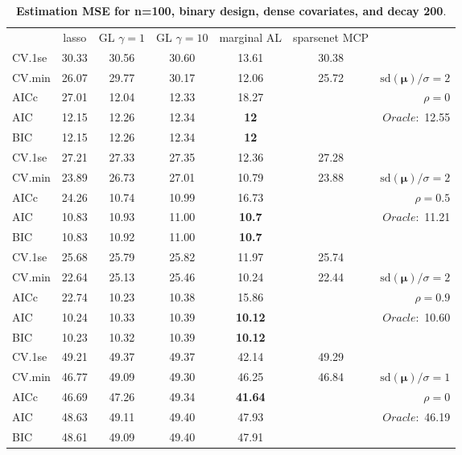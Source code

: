 \begin{table}\vspace{-.5cm}
\caption[l]{ { \bf Estimation MSE for n=100, binary design, 
dense covariates, and  decay  200}.}
\vspace{-.5cm}
\footnotesize{}
\begin{center}
\begin{tabular}{l*{5}{c}|r}
& lasso & GL $\gamma=1$ & GL $\gamma=10$ & marginal AL & sparsenet MCP  & \\
 \cline{1-7}
CV.1se & 30.33 & 30.56 & 30.60 & 13.61 & 30.38 & \\
CV.min & 26.07 & 29.77 & 30.17 & 12.06 & 25.72 &  $\mathrm{sd}(\mathbf{\mu})/\sigma=2$ \\
AICc & 27.01 & 12.04 & 12.33 & 18.27 & & $\rho=0$ \\
AIC & 12.15 & 12.26 & 12.34 & {\bf 12} & &  \multirow{2}{*}{$Oracle: $ 12.55} \\
BIC & 12.15 & 12.26 & 12.34 & {\bf 12} & &  \\
 \hline 
CV.1se & 27.21 & 27.33 & 27.35 & 12.36 & 27.28 & \\
CV.min & 23.89 & 26.73 & 27.01 & 10.79 & 23.88 &  $\mathrm{sd}(\mathbf{\mu})/\sigma=2$ \\
AICc & 24.26 & 10.74 & 10.99 & 16.73 & & $\rho=0.5$ \\
AIC & 10.83 & 10.93 & 11.00 & {\bf 10.7} & &  \multirow{2}{*}{$Oracle: $ 11.21} \\
BIC & 10.83 & 10.92 & 11.00 & {\bf 10.7} & &  \\
 \hline 
CV.1se & 25.68 & 25.79 & 25.82 & 11.97 & 25.74 & \\
CV.min & 22.64 & 25.13 & 25.46 & 10.24 & 22.44 &  $\mathrm{sd}(\mathbf{\mu})/\sigma=2$ \\
AICc & 22.74 & 10.23 & 10.38 & 15.86 & & $\rho=0.9$ \\
AIC & 10.24 & 10.33 & 10.39 & {\bf 10.12} & &  \multirow{2}{*}{$Oracle: $ 10.60} \\
BIC & 10.23 & 10.32 & 10.39 & {\bf 10.12} & &  \\
 \hline 
CV.1se & 49.21 & 49.37 & 49.37 & 42.14 & 49.29 & \\
CV.min & 46.77 & 49.09 & 49.30 & 46.25 & 46.84 &  $\mathrm{sd}(\mathbf{\mu})/\sigma=1$ \\
AICc & 46.69 & 47.26 & 49.34 & {\bf 41.64} & & $\rho=0$ \\
AIC & 48.63 & 49.11 & 49.40 & 47.93 & &  \multirow{2}{*}{$Oracle: $ 46.19} \\
BIC & 48.61 & 49.09 & 49.40 & 47.91 & &  \\

\end{tabular}
\end{center}
\end{table}
